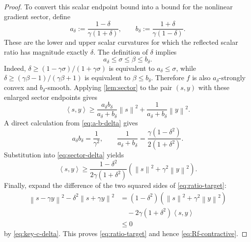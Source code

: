 \documentclass[10pt,leqno]{amsart}
\numberwithin{equation}{section}
\numberwithin{algorithm}{section}
\theoremstyle{remark}
\newcommand{\norm}[1]{\left\lVert #1 \right\rVert}
\newcommand{\ip}[2]{\left\langle #1,#2 \right\rangle}
\begin{document}
\begin{proof}
To convert this scalar endpoint bound into a bound for the nonlinear gradient sector, define
\begin{equation}
\label{eq:a-b-delta}
  a_\delta:=\frac{1-\delta}{\gamma(1+\delta)},
  \qquad
  b_\delta:=\frac{1+\delta}{\gamma(1-\delta)}.
\end{equation}
These are the lower and upper scalar curvatures for which the reflected scalar ratio has magnitude exactly $\delta$.  The definition of $\delta$ implies
\begin{equation}
\label{eq:interval-contained}
  a_\delta\le\sigma\le\beta\le b_\delta.
\end{equation}
Indeed,
$\delta\ge(1-\gamma\sigma)/(1+\gamma\sigma)$ is equivalent to
$a_\delta\le\sigma$, while
$\delta\ge(\gamma\beta-1)/(\gamma\beta+1)$ is equivalent to
$\beta\le b_\delta$.
Therefore $f$ is also $a_\delta$-strongly convex and
$b_\delta$-smooth.  Applying \cref{lem:sector} to the pair $(s,y)$ with these enlarged sector endpoints gives
\begin{equation}
\label{eq:sector-delta}
  \ip{s}{y}
  \ge
  \frac{a_\delta b_\delta}{a_\delta+b_\delta}\norm{s}^2
  +\frac{1}{a_\delta+b_\delta}\norm{y}^2.
\end{equation}
A direct calculation from \eqref{eq:a-b-delta} gives
\begin{equation}
\label{eq:delta-ab-calc}
  a_\delta b_\delta=\frac{1}{\gamma^2},
  \qquad
  \frac{1}{a_\delta+b_\delta}
  =\frac{\gamma(1-\delta^2)}{2(1+\delta^2)}.
\end{equation}
Substitution into \eqref{eq:sector-delta} yields
\begin{equation}
\label{eq:key-c-delta}
  \ip{s}{y}
  \ge
  \frac{1-\delta^2}{2\gamma(1+\delta^2)}
  \left(\norm{s}^2+\gamma^2\norm{y}^2\right).
\end{equation}
Finally, expand the difference of the two squared sides of \eqref{eq:ratio-target}:
\begin{align*}
  \norm{s-\gamma y}^2
  -\delta^2\norm{s+\gamma y}^2
  &=(1-\delta^2)
    \left(\norm{s}^2+\gamma^2\norm{y}^2\right)\\
  &\quad
    -2\gamma(1+\delta^2)\ip{s}{y}\\
  &\le0
\end{align*}
by \eqref{eq:key-c-delta}.  This proves \eqref{eq:ratio-target} and hence \eqref{eq:Rf-contractive}.
\end{proof}
\end{document}
